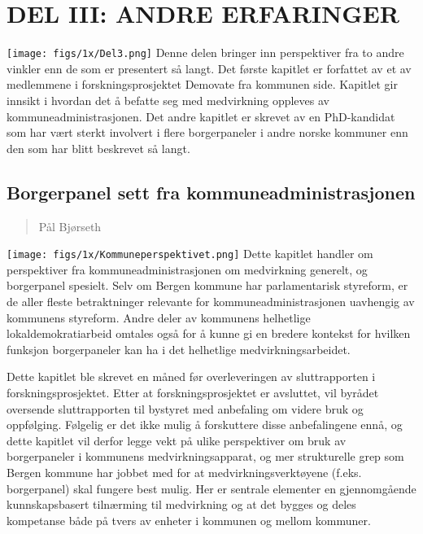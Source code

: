 \documentclass[
  12pt,
  a4paper, 12pt]{article}
\begin{document}
\newpage

\hypertarget{del-iii-andre-erfaringer}{%
\section{DEL III: ANDRE ERFARINGER}\label{del-iii-andre-erfaringer}}

\texttt{[image: figs/1x/Del3.png]}
Denne delen bringer inn perspektiver fra to andre vinkler enn de som er presentert så langt. Det første kapitlet er forfattet av et av medlemmene i forskningsprosjektet Demovate fra kommunen side. Kapitlet gir innsikt i hvordan det å befatte seg med medvirkning oppleves av kommuneadministrasjonen. Det andre kapitlet er skrevet av en PhD-kandidat som har vært sterkt involvert i flere borgerpaneler i andre norske kommuner enn den som har blitt beskrevet så langt.

\newpage

\hypertarget{borgerpanel-sett-fra-kommuneadministrasjonen}{%
\subsection{Borgerpanel sett fra kommuneadministrasjonen}\label{borgerpanel-sett-fra-kommuneadministrasjonen}}

\begin{quote}
Pål Bjørseth
\end{quote}

\texttt{[image: figs/1x/Kommuneperspektivet.png]}
Dette kapitlet handler om perspektiver fra kommuneadministrasjonen om medvirkning generelt, og borgerpanel spesielt. Selv om Bergen kommune har parlamentarisk styreform, er de aller fleste betraktninger relevante for kommuneadministrasjonen uavhengig av kommunens styreform. Andre deler av kommunens helhetlige lokaldemokratiarbeid omtales også for å kunne gi en bredere kontekst for hvilken funksjon borgerpaneler kan ha i det helhetlige medvirkningsarbeidet.

Dette kapitlet ble skrevet en måned før overleveringen av sluttrapporten i forskningsprosjektet. Etter at forskningsprosjektet er avsluttet, vil byrådet oversende sluttrapporten til bystyret med anbefaling om videre bruk og oppfølging. Følgelig er det ikke mulig å forskuttere disse anbefalingene ennå, og dette kapitlet vil derfor legge vekt på ulike perspektiver om bruk av borgerpaneler i kommunens medvirkningsapparat, og mer strukturelle grep som Bergen kommune har jobbet med for at medvirkningsverktøyene (f.eks. borgerpanel) skal fungere best mulig. Her er sentrale elementer en gjennomgående kunnskapsbasert tilnærming til medvirkning og at det bygges og deles kompetanse både på tvers av enheter i kommunen og mellom kommuner.
\end{document}
